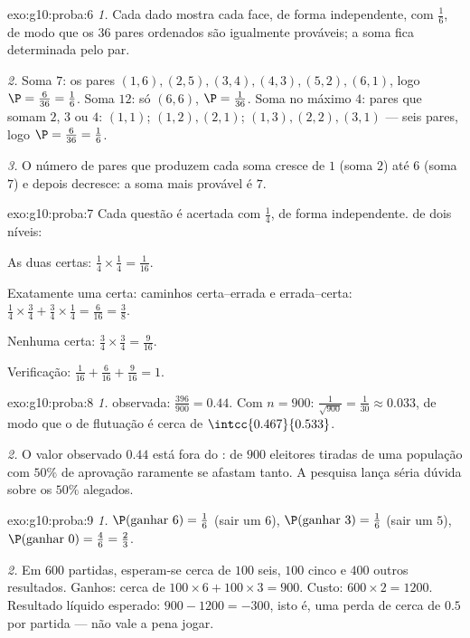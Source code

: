 \begin{solution}{exo:g10:proba:6}
\emph{1.} Cada dado mostra cada face, de forma independente, com
 $\frac16$, de modo que os $36$ pares ordenados são
igualmente prováveis; a soma fica determinada pelo par.

\emph{2.} Soma $7$: os pares $(1,6), (2,5), (3,4), (4,3), (5,2),
(6,1)$, logo $\P = \frac{6}{36} = \frac16$. Soma $12$: só $(6,6)$,
$\P = \frac{1}{36}$. Soma no máximo $4$: pares que somam $2$, $3$ ou
$4$: $(1,1)$; $(1,2), (2,1)$; $(1,3), (2,2), (3,1)$ --- seis pares,
logo $\P = \frac{6}{36} = \frac16$.

\emph{3.} O número de pares que produzem cada soma cresce de $1$ (soma
$2$) até $6$ (soma $7$) e depois decresce: a soma mais provável é $7$.
\end{solution}

\begin{solution}{exo:g10:proba:7}
Cada questão é acertada com  $\frac14$, de forma
independente.  de dois níveis:

As duas certas: $\frac14 \times \frac14 = \frac{1}{16}$.

Exatamente uma certa: caminhos certa--errada e errada--certa:
$\frac14 \times \frac34 + \frac34 \times \frac14 = \frac{6}{16}
= \frac38$.

Nenhuma certa: $\frac34 \times \frac34 = \frac{9}{16}$.

Verificação: $\frac{1}{16} + \frac{6}{16} + \frac{9}{16} = 1$.
\end{solution}

\begin{solution}{exo:g10:proba:8}
\emph{1.}  observada: $\frac{396}{900} = 0.44$. Com $n = 900$:
$\frac{1}{\sqrt{900}} = \frac{1}{30} \approx 0.033$, de modo que o
 de flutuação é cerca de $\intcc{0.467}{0.533}$.

\emph{2.} O valor observado $0.44$ está fora do :  de
$900$ eleitores tiradas de uma população com $50\%$ de aprovação
raramente se afastam tanto. A pesquisa lança séria dúvida sobre os
$50\%$ alegados.
\end{solution}

\begin{solution}{exo:g10:proba:9}
\emph{1.} $\P(\text{ganhar } 6) = \frac16$ (sair um $6$),
$\P(\text{ganhar } 3) = \frac16$ (sair um $5$),
$\P(\text{ganhar } 0) = \frac46 = \frac23$.

\emph{2.} Em $600$ partidas, esperam-se cerca de $100$ seis, $100$ cinco
e $400$ outros resultados. Ganhos: cerca de
$100 \times 6 + 100 \times 3 = 900$. Custo: $600 \times 2 = 1200$.
Resultado líquido esperado: $900 - 1200 = -300$, isto é, uma perda 
de cerca de $0.5$ por partida --- não vale a pena jogar.
\end{solution}

